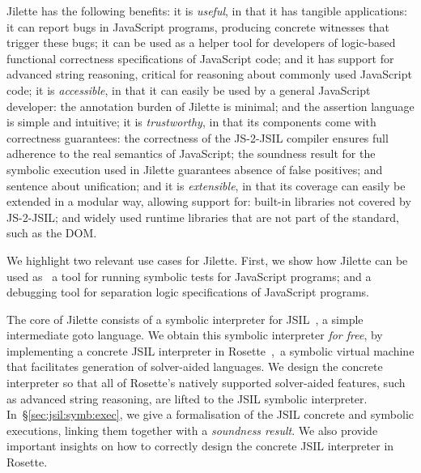\documentclass{llncs}
\newcommand{\jsil}{JSIL\xspace}
\newcommand{\JSComp}{JS-2-JSIL\xspace}
\newcommand{\polish}[1]{{\color{red}#1}}
\newcommand{\jilette}{Jilette\xspace}
\newcommand{\myparagraph}[1]{\smallskip\noindent {\bf #1.}\hspace{1pt}}
\begin{document}
Jilette has the following benefits: 
%
 it is \emph{useful}, in that it has tangible applications:
	it can report bugs in JavaScript programs, producing concrete witnesses that trigger these  bugs; 
	it can be used as a helper tool for developers of logic-based functional correctness specifications of JavaScript code; 
	and it has support for advanced string reasoning, critical for reasoning about commonly used JavaScript code;
%
 it is \emph{accessible}, in that it can easily be used by a general JavaScript developer: 
	the annotation burden of \jilette is minimal; 
	and the assertion language is simple and intuitive;
 it is \emph{trustworthy}, in that its components come with correctness guarantees: 
	the correctness of the \JSComp compiler ensures full adherence to the real semantics of JavaScript;
	the soundness result for the symbolic execution used in \jilette guarantees absence of false positives;
	and \polish{sentence about unification;}
and  it is \emph{extensible}, in that its coverage can easily be extended in a modular way, allowing support for: 
	built-in libraries not covered by \JSComp; 
	and widely used runtime libraries that are not part of the standard, such as the DOM.

We highlight two relevant use cases for \jilette. First, we show how \jilette can be used as ~a tool for running symbolic tests for JavaScript programs; and  a debugging tool for separation logic specifications of JavaScript programs. 

\myparagraph{Architecture}
The core of \jilette consists of a symbolic interpreter for
\jsil~\cite{javert}, a simple intermediate goto language. 
We obtain this symbolic interpreter \emph{for free}, 
by implementing a concrete \jsil interpreter in Rosette~\cite{Rosette2,Rosette1},~a 
symbolic virtual machine that facilitates generation of solver-aided languages.
We design the concrete interpreter so that all of Rosette's natively supported solver-aided
features, such as advanced string reasoning, 
are lifted to the \jsil symbolic interpreter. 
In~\S\ref{sec:jsil:symb:exec}, we give a formalisation of the \jsil concrete and symbolic executions, linking them together with a {\em soundness result}. We also provide 
important insights on how to correctly design the concrete \jsil interpreter in Rosette.
\end{document}
